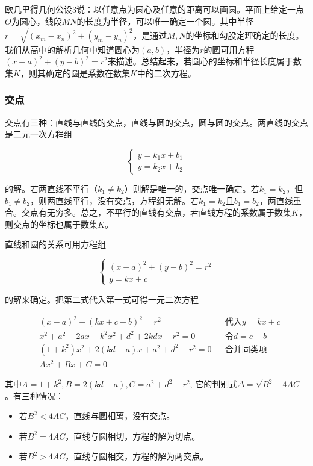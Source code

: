 \documentclass[b5paper]{ctexart}
\begin{document}
欧几里得几何公设3说：以任意点为圆心及任意的距离可以画圆。平面上给定一点$O$为圆心，线段$MN$的长度为半径，可以唯一确定一个圆。其中半径$r = \sqrt{(x_m - x_n)^2 + (y_m - y_n)^2}$，是通过$M, N$的坐标和勾股定理确定的长度。我们从高中的解析几何中知道圆心为$(a, b)$，半径为$r$的圆可用方程$(x - a)^2 + (y - b)^2 = r^2$来描述。总结起来，若圆心的坐标和半径长度属于数集$K$，则其确定的圆是系数在数集$K$中的二次方程。

\subsubsection{交点}
交点有三种：直线与直线的交点，直线与圆的交点，圆与圆的交点。两直线的交点是二元一次方程组

\[
\begin{cases}
y = k_1 x + b_1 \\
y = k_2 x + b_2
\end{cases}
\]

的解。若两直线不平行（$k_1 \ne k_2$）则解是唯一的，交点唯一确定。若$k_1 = k_2$，但$b_1 \ne b_2$，则两直线平行，没有交点，方程组无解。若$k_1 = k_2$且$b_1 = b_2$，两直线重合。交点有无穷多。总之，不平行的直线有交点，若直线方程的系数属于数集$K$，则交点的坐标也属于数集$K$。

直线和圆的关系可用方程组

\[
\begin{cases}
(x - a)^2 + (y - b)^2 = r^2 \\
y = kx + c
\end{cases}
\]

的解来确定。把第二式代入第一式可得一元二次方程

\begin{align*}
& (x - a)^2 + (kx + c - b)^2 = r^2  &&\text{代入}y = kx + c \\
& x^2 + a^2 - 2ax + k^2x^2 + d^2 + 2kdx - r^2 =0 && \text{令}d = c - b \\
& (1 + k^2)x^2 + 2(kd - a)x + a^2 + d^2 - r^2 = 0 && \text{合并同类项} \\
& Ax^2 + Bx + C = 0
\end{align*}

其中$A = 1 + k^2, B = 2(kd - a), C = a^2 + d^2 - r^2$, 它的判别式$\Delta = \sqrt{B^2 - 4AC}$。有三种情况：
\begin{itemize}
\item 若$B^2 < 4AC$，直线与圆相离，没有交点。
\item 若$B^2 = 4AC$，直线与圆相切，方程的解为切点。
\item 若$B^2 > 4AC$，直线与圆相交，方程的解为两交点。
\end{itemize}
\end{document}
